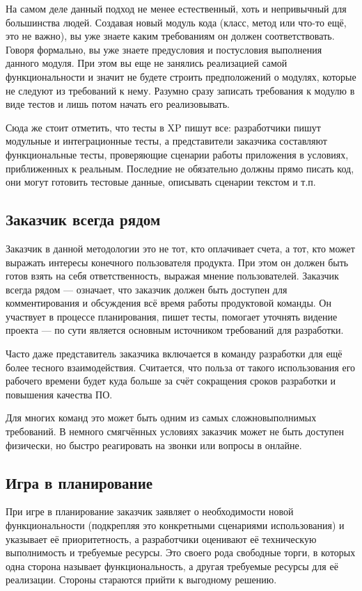 \documentclass{../../text-style}
\begin{document}
На самом деле данный подход не менее естественный, хоть и непривычный для большинства людей. Создавая новый модуль кода (класс, метод или что-то ещё, это не важно), вы уже знаете каким требованиям он должен соответствовать. Говоря формально, вы уже знаете предусловия и постусловия выполнения данного модуля. При этом вы еще не занялись реализацией самой функциональности и значит не будете строить предположений о модулях, которые не следуют из требований к нему. Разумно сразу записать требования к модулю в виде тестов и лишь потом начать его реализовывать.

Сюда же стоит отметить, что тесты в XP пишут все: разработчики пишут модульные и интеграционные тесты, а представители заказчика составляют функциональные тесты, проверяющие сценарии работы приложения в условиях, приближенных к реальным. Последние не обязательно должны прямо писать код, они могут готовить тестовые данные, описывать сценарии текстом и т.п.

\subsection{Заказчик всегда рядом}

Заказчик в данной методологии это не тот, кто оплачивает счета, а тот, кто может выражать интересы конечного пользователя продукта. При этом он должен быть готов взять на себя ответственность, выражая мнение пользователей. Заказчик всегда рядом --- означает, что заказчик должен быть доступен для комментирования и обсуждения всё время работы продуктовой команды. Он участвует в процессе планирования, пишет тесты, помогает уточнять видение проекта --- по сути является основным источником требований для разработки.

Часто даже представитель заказчика включается в команду разработки для ещё более тесного взаимодействия. Считается, что польза от такого использования его рабочего времени будет куда больше за счёт сокращения сроков разработки и повышения качества ПО.

Для многих команд это может быть одним из самых сложновыполнимых требований. В немного смягчённых условиях заказчик может не быть доступен физически, но быстро реагировать на звонки или вопросы в онлайне.

\subsection{Игра в планирование}

При игре в планирование заказчик заявляет о необходимости новой функциональности (подкрепляя это конкретными сценариями использования) и указывает её приоритетность, а разработчики оценивают её техническую выполнимость и требуемые ресурсы. Это своего рода свободные торги, в которых одна сторона называет функциональность, а другая требуемые ресурсы для её реализации. Стороны стараются прийти к выгодному решению.
\end{document}
